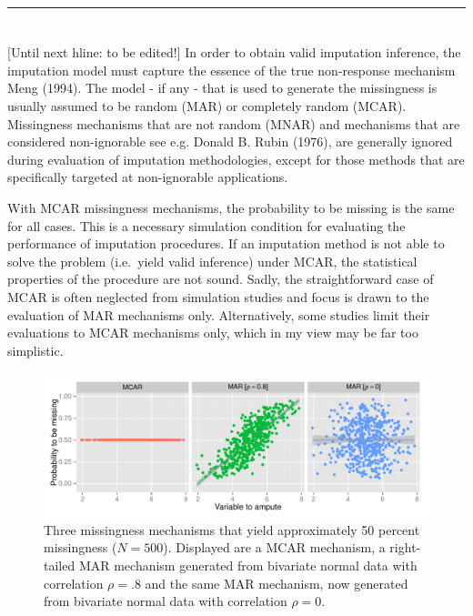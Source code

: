 \documentclass[
]{article}
\begin{document}
\hrule

\hypertarget{section-1}{%
\section{}\label{section-1}}

{[}Until next hline: to be edited!{]} In order to obtain valid
imputation inference, the imputation model must capture the essence of
the true non-response mechanism Meng (1994). The model - if any - that
is used to generate the missingness is usually assumed to be random
(MAR) or completely random (MCAR). Missingness mechanisms that are not
random (MNAR) and mechanisms that are considered non-ignorable see e.g.
Donald B. Rubin (1976), are generally ignored during evaluation of
imputation methodologies, except for those methods that are specifically
targeted at non-ignorable applications.

With MCAR missingness mechanisms, the probability to be missing is the
same for all cases. This is a necessary simulation condition for
evaluating the performance of imputation procedures. If an imputation
method is not able to solve the problem (i.e.~yield valid inference)
under MCAR, the statistical properties of the procedure are not sound.
Sadly, the straightforward case of MCAR is often neglected from
simulation studies and focus is drawn to the evaluation of MAR
mechanisms only. Alternatively, some studies limit their evaluations to
MCAR mechanisms only, which in my view may be far too simplistic.

\begin{figure}
\centering
\includegraphics{img/plot_mmech.pdf}
\caption{\label{fig:mis_mech}Three missingness mechanisms that yield
approximately 50 percent missingness (\(N=500\)). Displayed are a MCAR
mechanism, a right-tailed MAR mechanism generated from bivariate normal
data with correlation \(\rho=.8\) and the same MAR mechanism, now
generated from bivariate normal data with correlation \(\rho= 0\).}
\end{figure}
\end{document}
